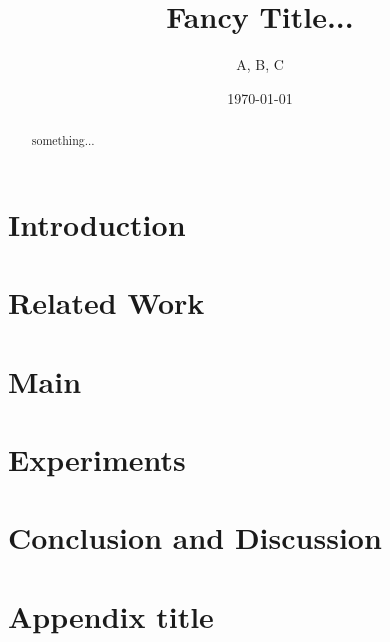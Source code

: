 \documentclass{article}
\begin{document}
\title{Fancy Title...}

\author{%
	A, B, C
}

\date{\today}                       
\maketitle

\begin{abstract}
something...
\end{abstract}


\section{Introduction}\label{sec:introduction}

\section{Related Work}\label{sec:related_work}

\section{Main}\label{sec:main}

\section{Experiments}\label{sec:experiments}

\section{Conclusion and Discussion}\label{s:ccl}

 

\newpage
\appendix
\section{Appendix title}\label{a:appendix1}
\end{document}
